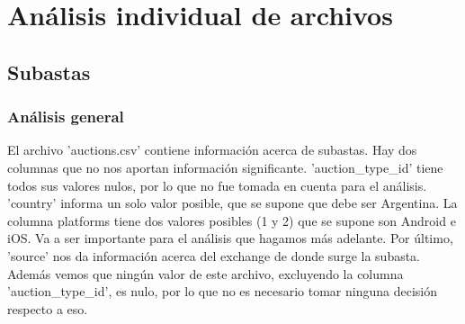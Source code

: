 \documentclass{article}
\newcommand\tab[1][1cm]{\hspace*{#1}}
\begin{document}
\section{Análisis individual de archivos}
\subsection{Subastas}
	\subsubsection{Análisis general}
	 \tab El archivo 'auctions.csv' contiene información acerca de subastas.
	Hay dos columnas que no nos aportan información significante. 'auction\_type\_id' tiene todos sus valores 		nulos, por lo que no fue tomada en cuenta para el análisis. 'country' informa un solo valor posible, que se supone que debe ser Argentina.
	\tab La columna platforms tiene dos valores posibles (1 y 2) que se supone son Android e iOS. Va a ser importante para el análisis que hagamos más adelante.
	\tab Por último, 'source' nos da información acerca del exchange de donde surge la subasta.
	\tab Además vemos que ningún valor de este archivo, excluyendo la columna 'auction\_type\_id', es nulo, por lo que no es necesario tomar ninguna decisión respecto a eso.
	
\end{document}
